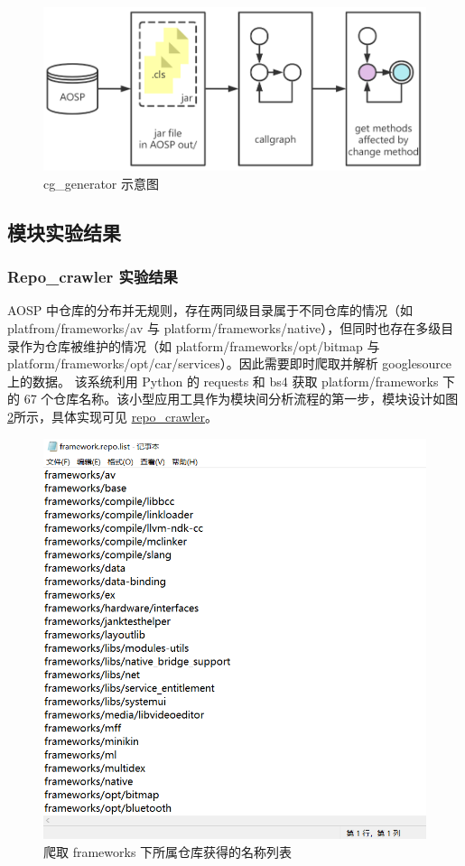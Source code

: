 \begin{figure}[htb]
    \centering
    \includegraphics[width=.9\textwidth]{figures/archi-cg-generator.png}
    \caption{cg\_generator 示意图}
    \label{fig:archi-cg-generator}
\end{figure}

\subsection{模块实验结果}

\subsubsection{Repo\_crawler 实验结果}

AOSP 中仓库的分布并无规则，存在两同级目录属于不同仓库的情况（如 platfrom/frameworks/av 与 platform/frameworks/native），但同时也存在多级目录作为仓库被维护的情况（如 platform/frameworks/opt/bitmap 与 platform/frameworks/opt/car/services）。因此需要即时爬取并解析 googlesource 上的数据。 该系统利用 Python 的 requests 和 bs4 获取 platform/frameworks 下的 67 个仓库名称。该小型应用工具作为模块间分析流程的第一步，模块设计如图\ref{fig:design-repo-list}所示，具体实现可见 \href{https://github.com/AOSPworking/repo_crawler}{repo\_crawler}。

\begin{figure}[htb]
    \centering
    \includegraphics[width=.4\textwidth]{figures/design-repo-list.png}
    \caption{爬取 frameworks 下所属仓库获得的名称列表}
    \label{fig:design-repo-list}
\end{figure}

